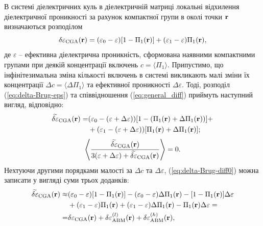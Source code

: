 \documentclass[14pt,twoside]{vakthesis}
\begin{document}


В системі діелектричних куль в діелектричній матриці локальні відхилення діелектричної проникності за рахунок компактної групи в околі точки $\bf r$ визначаються розподілом
\begin{equation}\label{eq:delta-Brug-eps}
\delta{\varepsilon}_{\rm CGA} ({\bf r}) = (\varepsilon_0 - \varepsilon) [1 - \Pi_1 ({\bf r})] + (\varepsilon_1 - \varepsilon) \Pi_1 ({\bf r}),
\end{equation}
де $\varepsilon$ -- ефективна діелектрична проникність, сформована наявними компактними групами при деякій концентрації включень $c = \langle \Pi_1 \rangle$. Припустимо, що інфінітезимальна зміна кількості включень в системі викликають малі зміни їх концентрації $\Delta c = \langle \Delta\Pi_1 \rangle$ та ефективної проникності $\Delta\varepsilon$. Тоді, розподіл (\ref{eq:delta-Brug-eps}) та співвідношення (\ref{eq:general_diff}) приймуть наступний вигляд, відповідно:
\begin{equation}\label{eq:delta-Brug-diff0}
\begin{split}
\widetilde{\delta\varepsilon}_{\rm CGA} ({\bf r}) =& (\varepsilon_0 - (\varepsilon + \Delta\varepsilon)) [1 - (\Pi_1 ({\bf r}) + \Delta\Pi_1 ({\bf r}))] +\\
&+ (\varepsilon_1 - (\varepsilon +   \Delta\varepsilon)) [\Pi_1 ({\bf r}) + \Delta\Pi_1 ({\bf r})];
\end{split}
\end{equation}
\begin{equation}\label{eq:general_diff-tilde}
\left\langle \frac{\widetilde{\delta\varepsilon}_{\rm CGA}({\bf r})}{3(\varepsilon + \Delta\varepsilon) + \widetilde{\delta\varepsilon}_{\rm CGA}({\bf r})} \right\rangle = 0.
\end{equation}
Нехтуючи другими порядками малості за $\Delta c$ та $\Delta\varepsilon$, (\ref{eq:delta-Brug-diff0}) можна записати у вигляді суми трьох доданків:
\begin{equation}\label{eq:delta-Brug-diff}
\begin{split}
\widetilde{\delta\varepsilon}_{\rm CGA} ({\bf r}) 
\approx& (\varepsilon_0 - \varepsilon) [1 - \Pi_1 ({\bf r})] - (\varepsilon_0 - \varepsilon)  \Delta\Pi_1 ({\bf r}) -  [1 - \Pi_1 ({\bf r})]\Delta\varepsilon \\
&+ (\varepsilon_1 - \varepsilon) \Pi_1 ({\bf r}) + (\varepsilon_1 - \varepsilon) \Delta\Pi_1 ({\bf r}) -  \Pi_1 ({\bf r}) \Delta\varepsilon = \\
=& \delta\varepsilon_{\rm CGA} ({\bf r}) + \delta\varepsilon_{\rm ABM}^{(l)} ({\bf r}) + \delta\varepsilon_{\rm ABM}^{(h)} ({\bf r}),
\end{split}
\end{equation}
\end{document}
